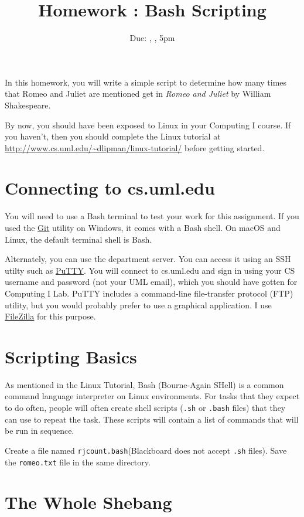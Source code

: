 \documentclass[12pt]{article}
\title{Homework \hwno: Bash Scripting}
\date{Due: \dayofweekname{\duedate}{\duemonth}{\year}, \monthname[\duemonth] \duedate, 5pm}
\newcommand{\code}[1]{\texttt{#1}}
\newcommand{\filename}{\code{rjcount.bash}\xspace}
\begin{document}
\maketitle

In this homework, you will write a simple script to determine how many times that Romeo and Juliet are mentioned get in \emph{Romeo and Juliet} by William Shakespeare.

By now, you should have been exposed to Linux in your Computing I course.  If you haven't, then you should complete the Linux tutorial at \url{http://www.cs.uml.edu/~dlipman/linux-tutorial/} before getting started.

\section*{Connecting to cs.uml.edu}
You will need to use a Bash terminal to test your work for this assignment.
If you used the \href{https://git-scm.com/}{Git} utility on Windows, it comes with a Bash shell.
On macOS and Linux, the default terminal shell is Bash.

Alternately, you can use the department server.
You can access it using an SSH utilty such as \href{https://www.chiark.greenend.org.uk/~sgtatham/putty/latest.html}{PuTTY}.
You will connect to cs.uml.edu and sign in using your CS username and password (not your UML email), which you should have gotten for Computing I Lab.
PuTTY includes a command-line file-transfer protocol (FTP) utility, but you would probably prefer to use a graphical application.
I use \href{https://filezilla-project.org/}{FileZilla} for this purpose.


\section*{Scripting Basics}
As mentioned in the Linux Tutorial, Bash (Bourne-Again SHell) is a common command language interpreter on Linux environments.
For tasks that they expect to do often, people will often create shell scripts (\code{.sh} or \code{.bash} files) that they can use to repeat the task.
These scripts will contain a list of commands that will be run in sequence.

Create a file named \filename (Blackboard does not accept \code{.sh} files).  Save the \code{romeo.txt} file in the same directory.

\section*{The Whole Shebang}
\end{document}
